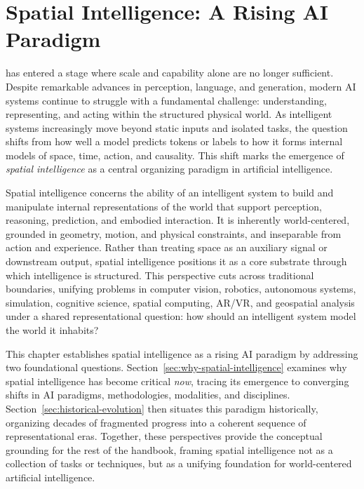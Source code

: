 

\chapter{Spatial Intelligence: A Rising AI Paradigm}
\label{chapter:intro}






has entered a stage where scale and capability alone are no longer sufficient.
Despite remarkable advances in perception, language, and generation, modern AI systems continue to struggle with a fundamental challenge: understanding, representing, and acting within the structured physical world.
As intelligent systems increasingly move beyond static inputs and isolated tasks, the question shifts from how well a model predicts tokens or labels to how it forms internal models of space, time, action, and causality.
This shift marks the emergence of \emph{spatial intelligence} as a central organizing paradigm in artificial intelligence.


Spatial intelligence concerns the ability of an intelligent system to build and manipulate internal representations of the world that support perception, reasoning, prediction, and embodied interaction.
It is inherently world-centered, grounded in geometry, motion, and physical constraints, and inseparable from action and experience.
Rather than treating space as an auxiliary signal or downstream output, spatial intelligence positions it as a core substrate through which intelligence is structured.
This perspective cuts across traditional boundaries, unifying problems in computer vision, robotics, autonomous systems, simulation, cognitive science, spatial computing, AR/VR, and geospatial analysis under a shared representational question: how should an intelligent system model the world it inhabits?


This chapter establishes spatial intelligence as a rising AI paradigm by addressing two foundational questions.
Section~\ref{sec:why-spatial-intelligence} examines why spatial intelligence has become critical \emph{now}, tracing its emergence to converging shifts in AI paradigms, methodologies, modalities, and disciplines.
Section~\ref{sec:historical-evolution} then situates this paradigm historically, organizing decades of fragmented progress into a coherent sequence of representational eras.
Together, these perspectives provide the conceptual grounding for the rest of the handbook, framing spatial intelligence not as a collection of tasks or techniques, but as a unifying foundation for world-centered artificial intelligence.









